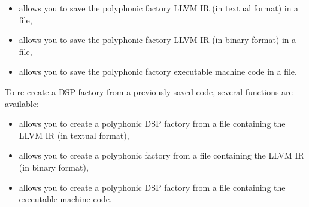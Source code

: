 \begin{itemize}
\item {} allows you to save the polyphonic factory LLVM IR (in textual format) in a file,
\item {} allows you to save the polyphonic factory LLVM IR (in binary format) in a file,
\item {} allows you to save the polyphonic factory executable machine code in a file.
\end{itemize}

To re-create a DSP factory from a previously saved code, several functions are available:

\begin{itemize}
\item {} allows you to create a polyphonic DSP factory from a file containing the LLVM IR (in textual format),
\item {} allows you to create a polyphonic  factory from a file containing the LLVM IR (in binary format),
\item {} allows you to create a polyphonic DSP factory from a file containing the executable machine code.
\end{itemize}
